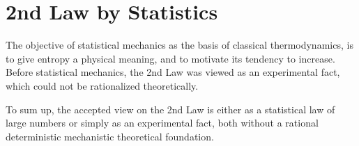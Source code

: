 




\section{2nd Law by Statistics}
The objective
of statistical mechanics as the basis of classical thermodynamics,
is to give entropy a physical meaning, and to motivate
its tendency to increase. Before statistical mechanics,
the 2nd Law was viewed as an experimental fact, which could not
be rationalized theoretically.

To sum up, the accepted view on the 2nd Law 
is either as a statistical law of large numbers or simply as an 
experimental fact, both without a rational deterministic mechanistic 
theoretical foundation. 


